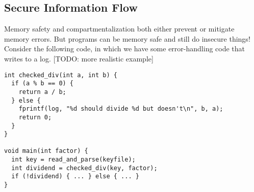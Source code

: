 \documentclass{llncs}
\begin{document}





\subsection{Secure Information Flow}
\label{sec:SIF}

Memory safety and compartmentalization both either prevent or mitigate memory errors.
But programs can be memory safe and still do insecure things! Consider the
following code, in which we have some error-handling code that writes to a log.
[TODO: more realistic example]

\begin{verbatim}
int checked_div(int a, int b) {
  if (a % b == 0) {
    return a / b;
  } else {
    fprintf(log, "%d should divide %d but doesn't\n", b, a);
    return 0;
  }
}

void main(int factor) {
  int key = read_and_parse(keyfile);
  int dividend = checked_div(key, factor);
  if (!dividend) { ... } else { ... }
}
\end{verbatim}
\end{document}
